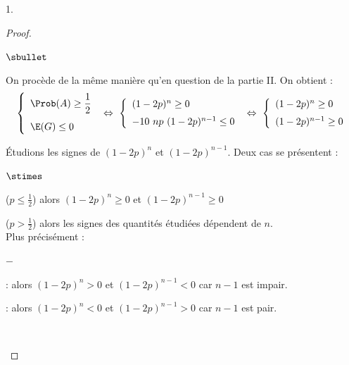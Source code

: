 \begin{noliste}{1.}
  \begin{proof}~%
    \begin{noliste}{$\sbullet$}
    \item On procède de la même manière qu'en question  de la
      partie II. On obtient :
      \[
      \left\{
        \begin{array}{l}
          \Prob(A) \geq \dfrac{1}{2} 
          \\[.4cm]
          \E(G) \leq 0
        \end{array}
      \right. \ \Leftrightarrow \ \left\{
        \begin{array}{l}
          (1-2p)^n \geq 0 
          \\[.2cm]
          -10 \ np \ (1-2p)^{n-1} \leq 0
        \end{array}
      \right. \ \Leftrightarrow \ \left\{
        \begin{array}{l}
          (1-2p)^n \geq 0 
          \\[.2cm]
          (1-2p)^{n-1} \geq 0
        \end{array}
      \right. 
      \]

    \item Étudions les signes de $(1-2p)^n$ et $(1-2p)^{n-1}$. Deux
      cas se présentent :
      \begin{noliste}{$\stimes$}
      \item {} (\ie $p \leq \frac{1}{2}$)
        alors $(1-2p)^n \geq 0$ et $(1-2p)^{n-1} \geq 0$
      \item {} (\ie $p > \frac{1}{2}$) alors
        les signes des quantités étudiées dépendent de $n$.\\
        Plus précisément :
        \begin{noliste}{$-$}
        \item {} : alors $(1-2p)^n > 0$ et
          $(1-2p)^{n-1} < 0$ car $n-1$ est impair.
        \item {} : alors $(1-2p)^n < 0$ et
          $(1-2p)^{n-1} > 0$ car $n-1$ est pair.
        \end{noliste}
      \end{noliste}
      ~\\[-1.4cm]
    \end{noliste}
  \end{proof}


\end{noliste}
